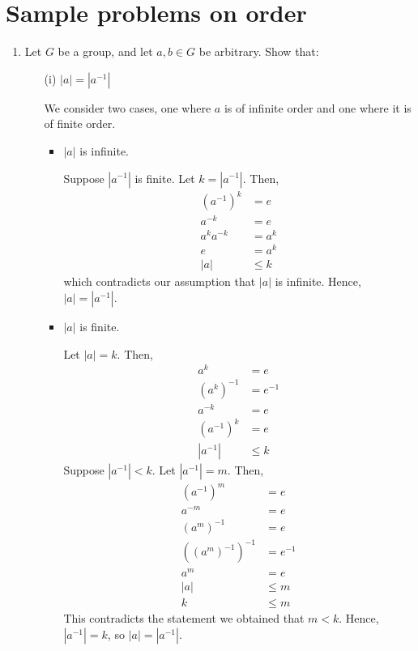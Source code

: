 \section{Sample problems on order}
    \renewcommand{\leftmark}{February 28, 2024}

    \begin{enumerate}
        \item Let \(G\) be a group, and let \(a, b\in G\) be arbitrary. Show that:
        \begin{enumerate}
            \item[(i)] \(|a| = |a^{-1}|\)

            We consider two cases, one where \(a\) is of infinite order and one where it is of finite order.
            \begin{itemize}
                \item \(|a|\) is infinite. 

                Suppose \(|a^{-1}|\) is finite. Let \(k = |a^{-1}|\). Then,
                \begin{align*}
                    (a^{-1})^k &= e \\
                    a^{-k} &= e \\
                    a^k a^{-k} &= a^k \\
                    e &= a^k \\
                    |a| &\leq k
                \end{align*}
                which contradicts our assumption that \(|a|\) is infinite. Hence, \(|a| = |a^{-1}|\).

                \item \(|a|\) is finite.

                Let \(|a| = k\). Then,
                \begin{align*}
                    a^k &= e \\
                    (a^k)^{-1} &= e^{-1} \\
                    a^{-k} &= e \\
                    (a^{-1})^k &= e \\
                    |a^{-1}| &\leq k
                \end{align*}
                Suppose \(|a^{-1}| < k\). Let \(|a^{-1}| = m\). Then,
                \begin{align*}
                    (a^{-1})^m &= e \\
                    a^{-m} &= e \\
                    (a^{m})^{-1} &= e \\
                    ((a^{m})^{-1})^{-1} &= e^{-1} \\
                    a^{m} &= e \\
                    |a| &\leq m \\
                    k &\leq m
                \end{align*}
                This contradicts the statement we obtained that \(m < k\). Hence, \(|a^{-1}| = k\), so \(|a| = |a^{-1}|\).
            \end{itemize}


\end{enumerate}
\end{enumerate}
